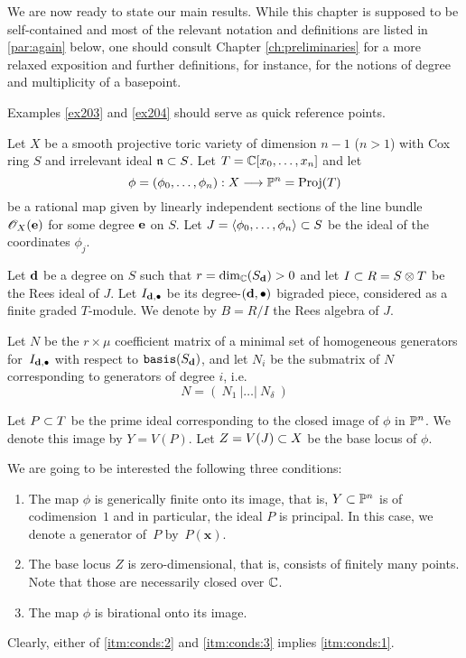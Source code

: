 \documentclass[fleqn,reqno]{amsart}
\begin{document}



\begin{paragraf*}
We are now ready to state our main results.
While this chapter is supposed to be self-contained and most of the relevant notation
and definitions are listed in \eqref{par:again} below,
one should consult Chapter \ref{ch:preliminaries} for a more relaxed exposition
and further definitions, for instance,
for the notions of degree and multiplicity of a basepoint.

Examples \ref{ex203} and \ref{ex204} should serve as quick reference points.
\end{paragraf*}

\begin{paragraf}
\label{par:again}
\label{par:setup}
Let $X$ be a smooth projective toric variety of dimension $n-1$ ($n>1$)
with Cox ring $S$ and irrelevant ideal $\mathfrak{n}\subset S$.
Let $T=\mathbb{C}[x_0,\ldots,x_n]$ and let
\[
\phi=(\phi_0,\ldots,\phi_n):X\longrightarrow\mathbb{P}^n=\operatorname{Proj}(T)
\]
be a rational map given by linearly independent sections of the line bundle $\mathscr{O}_X(\mathbf e)$
for some degree $\mathbf e$ on $S$.
Let $J=\langle \phi_0,\ldots,\phi_n\rangle\subset S$ be the ideal of the coordinates $\phi_j$.

Let $\mathbf d$ be a degree on $S$ such that $r=\dim_{\mathbb{C}}(S_\mathbf d)>0$ and
let $I\subset R=S\otimes T$ be the Rees ideal of $J$.
Let $I_{\mathbf d,\bullet}$ be its degree-$(\mathbf d,\bullet)$ bigraded piece,
considered as a finite graded $T$-module.
We denote by $B=R/I$ the Rees algebra of $J$.

Let $N$ be the $r\times\mu$ coefficient matrix of
a minimal set of homogeneous generators for~$I_{\mathbf d,\bullet}$ with respect to $\mathop{\tt basis}(S_\mathbf d)$,
and let $N_i$ be the submatrix of $N$ corresponding to generators of degree $i$, i.e.
\[
N=(~N_1~|\ldots|~N_\delta~)
\]
\end{paragraf}

\begin{paragraf}
\label{par:conds}
Let $P\subset T$ be the prime ideal corresponding to the closed image of $\phi$ in $\mathbb{P}^n$.
We denote this image by $Y=V(P)$.
Let $Z=V(J)\subset X$ be the base locus of $\phi$.

We are going to be interested the following three conditions:
\begin{enumerate}
\item
\label{itm:conds:1}
The map $\phi$ is generically finite onto its image, that is,
$Y\subset\mathbb{P}^n$ is of codimension~$1$ and in particular, the ideal $P$ is principal.
In this case, we denote a generator of~$P$ by~$P(\mathbf x)$.

\item
\label{itm:conds:2} The base locus $Z$ is zero-dimensional, that is,
consists of finitely many points.
Note that those are necessarily closed over $\mathbb{C}$.

\item
\label{itm:conds:3} The map $\phi$ is birational onto its image.
\end{enumerate}

Clearly, either of \eqref{itm:conds:2} and \eqref{itm:conds:3} implies \eqref{itm:conds:1}.
\end{paragraf}
\end{document}
